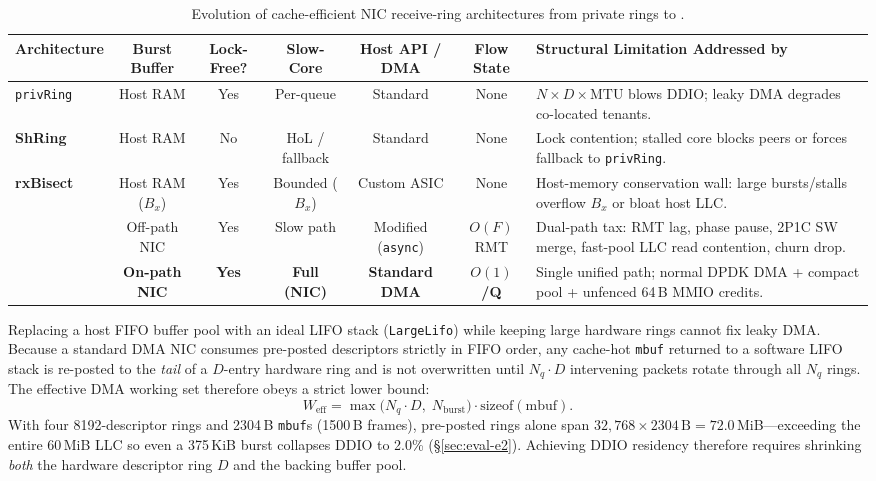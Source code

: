 \begin{table}[t]
\centering
\footnotesize
\setlength{\tabcolsep}{4.0pt}
\renewcommand{\arraystretch}{1.08}
\begin{tabularx}{\textwidth}{l c c c c c Y}
\toprule
\textbf{Architecture} &
\textbf{Burst Buffer} &
\textbf{Lock-Free?} &
\textbf{Slow-Core} &
\textbf{Host API / DMA} &
\textbf{Flow State} &
\textbf{Structural Limitation Addressed by \sys{}} \\
\midrule
\texttt{privRing} & Host RAM & Yes & Per-queue & Standard & None &
$N \times D \times \text{MTU}$ blows DDIO; leaky DMA degrades co-located tenants. \\
\textbf{ShRing}~\cite{pismenny2023shring} & Host RAM & No & HoL / fallback & Standard & None &
Lock contention; stalled core blocks peers or forces fallback to \texttt{privRing}. \\
\textbf{rxBisect}~\cite{pismenny2025rxbisect} & Host RAM ($B_x$) & Yes & Bounded ($B_x$) & Custom ASIC & None &
Host-memory conservation wall: large bursts/stalls overflow $B_x$ or bloat host LLC. \\
\textbf{\ceio{}}~\cite{liu2025ceio} & Off-path NIC & Yes & Slow path & Modified (\texttt{async}) & $O(F)$ RMT &
Dual-path tax: RMT lag, phase pause, 2P1C SW merge, fast-pool LLC read contention, churn drop. \\
\midrule
\textbf{\sys{}} & \textbf{On-path NIC} & \textbf{Yes} & \textbf{Full (NIC)} & \textbf{Standard DMA} & \textbf{$O(1)$/Q} &
Single unified path; normal DPDK DMA + compact pool + unfenced 64\,B MMIO credits. \\
\bottomrule
\end{tabularx}
\caption{Evolution of cache-efficient NIC receive-ring architectures from private rings to \sys{}.}
\label{tab:design-space}
\end{table}

Replacing a host FIFO buffer pool with an ideal LIFO stack (\texttt{LargeLifo})
while keeping large hardware rings cannot fix leaky DMA. Because a standard DMA
NIC consumes pre-posted descriptors strictly in FIFO order, any cache-hot
\texttt{mbuf} returned to a software LIFO stack is re-posted to the \emph{tail}
of a $D$-entry hardware ring and is not overwritten until $N_q \cdot D$
intervening packets rotate through all $N_q$ rings. The effective DMA working
set therefore obeys a strict lower bound:
\begin{equation}
  W_{\text{eff}} = \max\!\bigl(N_q \cdot D,\; N_{\text{burst}}\bigr) \cdot \text{sizeof}(\text{mbuf}).
  \label{eq:fifo-lower-bound}
\end{equation}
With four 8192-descriptor rings and 2304\,B \texttt{mbuf}s (1500\,B frames),
pre-posted rings alone span $32{,}768 \times 2304\,\text{B} = 72.0$\,MiB---exceeding
the entire 60\,MiB LLC so even a 375\,KiB burst collapses DDIO to 2.0\%
(\S\ref{sec:eval-e2}). Achieving DDIO residency therefore requires shrinking
\emph{both} the hardware descriptor ring $D$ and the backing buffer pool.

